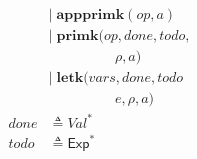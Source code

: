 \documentclass[12pt,draft]{article}
\begin{document}
\begin{multicols*}{2}
\begin{center}
\begin{align*}
        &|\; \textbf{appprimk}(op, a) \\
        &|\; \textbf{primk}(op, done, todo, \\
        &\;\;\;\;\;\;\;\;\;\;\;\;\;\;\;\;\;\rho, a) \\
        &|\; \textbf{letk}(vars, done, todo \\
        &\;\;\;\;\;\;\;\;\;\;\;\;\;\;\;\;\;e, \rho, a) \\
done &\triangleq \textit{Val}^* \\
todo &\triangleq \textsf{Exp}^*
\end{align*}
\end{center}
\end{multicols*}


\newpage
\end{document}
